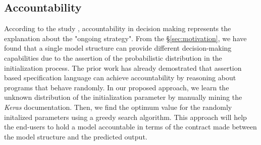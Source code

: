 \subsection{Accountability}
According to the study \cite{veale2018fairness}, accountability in decision making represents the explanation about the "ongoing strategy". From the \S\ref{sec:motivation}, we have found that a single model structure can provide different decision-making capabilities due to the assertion of the probabilistic distribution in the initialization process. The prior work \cite{sampson2014expressing} has already demostrated that assertion based specification language can achieve accountability by reasoning about programs that behave randomly.
In our proposed approach, we learn the unknown distribution of the initialization parameter by manually mining the \emph{Keras} documentation. Then, we find the optimum value for the randomly initalized parameters using a greedy search algorithm. This approach will help the end-users to hold a model accountable in terms of the contract made between the model structure and the predicted output.

